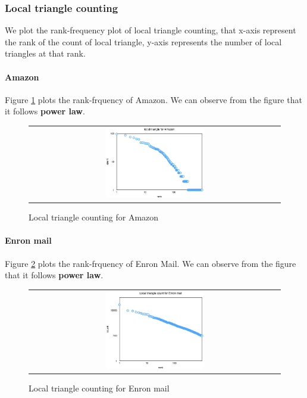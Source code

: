 \subsubsection{Local triangle counting}
We plot the rank-frequency plot of local triangle counting, that x-axis represent the rank of the count of local triangle, y-axis represents the number of local triangles at that rank. 

\paragraph{Amazon}
Figure \ref{t7:amazon} plots the rank-frquency of Amazon. We can observe from the figure that it follows {\bf power law}. 
\begin{figure}[!htbf]
\begin{center}
\begin{tabular}{c}
     \includegraphics[width=0.4\textwidth]{FIG/t7_amazon.png}
\end{tabular}
\caption{Local triangle counting for Amazon}
\label{t7:amazon}
\end{center}
\end{figure}

\paragraph{Enron mail}
Figure \ref{t7:enron} plots the rank-frquency of Enron Mail. We can observe from the figure that it follows {\bf power law}. 
\begin{figure}[!htbf]
\begin{center}
\begin{tabular}{c}
     \includegraphics[width=0.4\textwidth]{FIG/t7_enron.png}
\end{tabular}
\caption{Local triangle counting for Enron mail}
\label{t7:enron}
\end{center}
\end{figure}

